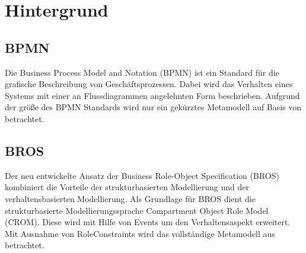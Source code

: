 \chapter{Hintergrund}

\section{BPMN}

Die Business Process Model and Notation (BPMN) ist ein Standard für die grafische Beschreibung von Geschäftsprozessen.
Dabei wird das Verhalten eines Systems mit einer an Flussdiagrammen angelehnten Form beschrieben.
Aufgrund der größe des BPMN Standards wird nur ein gekürztes Metamodell auf Basis von \cite{Loja2010} betrachtet.

\section{BROS}

Der neu entwickelte Ansatz der Business Role-Object Specification (BROS) kombiniert die Vorteile der strukturbasierten Modellierung und der verhaltensbasierten Modellierung.
Als Grundlage für BROS dient die strukturbasierte Modellierungssprache Compartment Object Role Model (CROM).
Diese wird mit Hilfe von Events um den Verhaltensaspekt erweitert.
Mit Ausnahme von RoleConstraints wird das vollständige Metamodell aus \cite{Schoen} betrachtet.
